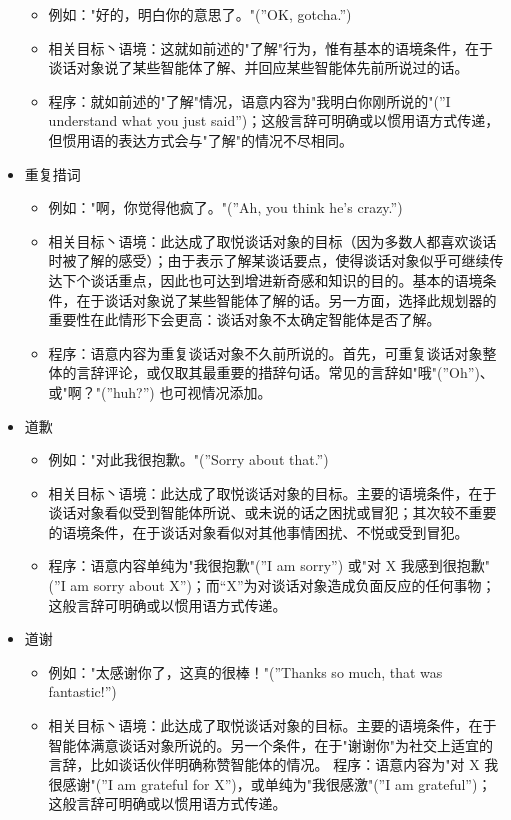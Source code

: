 \begin{itemize}
\begin {itemize}
\item 例如："好的，明白你的意思了。"(”OK, gotcha.”)
\item 相关目标丶语境：这就如前述的"了解"行为，惟有基本的语境条件，在于谈话对象说了某些智能体了解、并回应某些智能体先前所说过的话。 
\item 程序：就如前述的"了解"情况，语意内容为"我明白你刚所说的"(”I understand what you just said”)；这般言辞可明确或以惯用语方式传递，但惯用语的表达方式会与"了解"的情况不尽相同。
\end{itemize}
\item 重复措词
\begin{itemize}
\item 例如："啊，你觉得他疯了。"(”Ah, you think he’s crazy.”)
\item 相关目标丶语境：此达成了取悦谈话对象的目标（因为多数人都喜欢谈话时被了解的感受）；由于表示了解某谈话要点，使得谈话对象似乎可继续传达下个谈话重点，因此也可达到增进新奇感和知识的目的。基本的语境条件，在于谈话对象说了某些智能体了解的话。另一方面，选择此规划器的重要性在此情形下会更高：谈话对象不太确定智能体是否了解。
\item 程序：语意内容为重复谈话对象不久前所说的。首先，可重复谈话对象整体的言辞评论，或仅取其最重要的措辞句话。常见的言辞如"哦"(”Oh”)、或"啊？"(”huh?”) 也可视情况添加。
\end{itemize}
\item 道歉
\begin{itemize}
\item 例如："对此我很抱歉。"(”Sorry about that.”)
\item 相关目标丶语境：此达成了取悦谈话对象的目标。主要的语境条件，在于谈话对象看似受到智能体所说、或未说的话之困扰或冒犯；其次较不重要的语境条件，在于谈话对象看似对其他事情困扰、不悦或受到冒犯。 
\item 程序：语意内容单纯为"我很抱歉"(”I am sorry”) 或"对 X 我感到很抱歉"(”I am sorry about X”)；而“X”为对谈话对象造成负面反应的任何事物；这般言辞可明确或以惯用语方式传递。
\end{itemize}
\item 道谢
\begin{itemize}
\item 例如："太感谢你了，这真的很棒！"(”Thanks so much, that was fantastic!”)
\item 相关目标丶语境：此达成了取悦谈话对象的目标。主要的语境条件，在于智能体满意谈话对象所说的。另一个条件，在于"谢谢你"为社交上适宜的言辞，比如谈话伙伴明确称赞智能体的情况。
程序：语意内容为"对 X 我很感谢"(”I am grateful for X”)，或单纯为"我很感激"(”I am grateful”)；这般言辞可明确或以惯用语方式传递。

\end{itemize}
\end{itemize}
